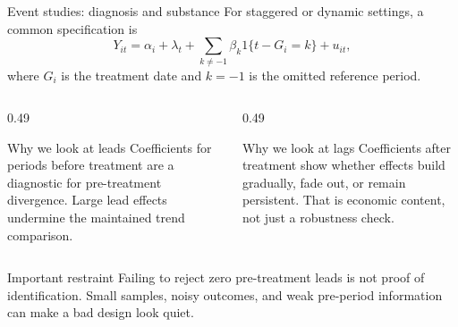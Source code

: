 \documentclass[10pt]{beamer}
\begin{document}
\begin{frame}{Event studies: diagnosis and substance}
\label{slide:eventstudy}
\small
For staggered or dynamic settings, a common specification is
\[
Y_{it} = \alpha_i + \lambda_t + \sum_{k\neq -1}\beta_k 1\{t-G_i=k\}+u_{it},
\]
where $G_i$ is the treatment date and $k=-1$ is the omitted reference period.

\begin{columns}[T]
\begin{column}{0.49\textwidth}
\begin{block}{Why we look at leads}
Coefficients for periods before treatment are a diagnostic for pre-treatment divergence. Large lead effects undermine the maintained trend comparison.
\end{block}
\end{column}
\begin{column}{0.49\textwidth}
\begin{block}{Why we look at lags}
Coefficients after treatment show whether effects build gradually, fade out, or remain persistent. That is economic content, not just a robustness check.
\end{block}
\end{column}
\end{columns}

\begin{alertblock}{Important restraint}
Failing to reject zero pre-treatment leads is not proof of identification. Small samples, noisy outcomes, and weak pre-period information can make a bad design look quiet.
\end{alertblock}
\end{frame}
\end{document}
